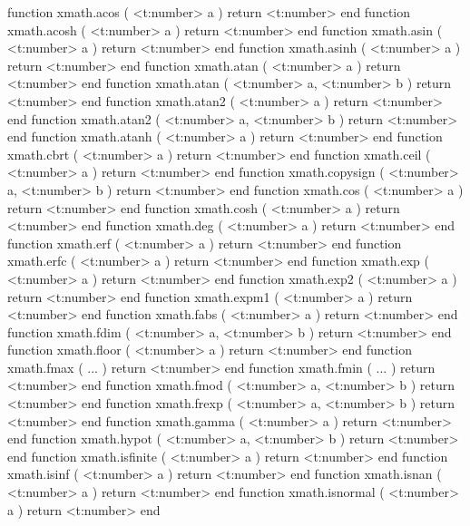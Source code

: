 \starttyping[option=LUA]
function xmath.acos       ( <t:number> a )               return <t:number> end
function xmath.acosh      ( <t:number> a )               return <t:number> end
function xmath.asin       ( <t:number> a )               return <t:number> end
function xmath.asinh      ( <t:number> a )               return <t:number> end
function xmath.atan       ( <t:number> a )               return <t:number> end
function xmath.atan       ( <t:number> a, <t:number> b ) return <t:number> end
function xmath.atan2      ( <t:number> a )               return <t:number> end
function xmath.atan2      ( <t:number> a, <t:number> b ) return <t:number> end
function xmath.atanh      ( <t:number> a )               return <t:number> end
function xmath.cbrt       ( <t:number> a )               return <t:number> end
function xmath.ceil       ( <t:number> a )               return <t:number> end
function xmath.copysign   ( <t:number> a, <t:number> b ) return <t:number> end
function xmath.cos        ( <t:number> a )               return <t:number> end
function xmath.cosh       ( <t:number> a )               return <t:number> end
function xmath.deg        ( <t:number> a )               return <t:number> end
function xmath.erf        ( <t:number> a )               return <t:number> end
function xmath.erfc       ( <t:number> a )               return <t:number> end
function xmath.exp        ( <t:number> a )               return <t:number> end
function xmath.exp2       ( <t:number> a )               return <t:number> end
function xmath.expm1      ( <t:number> a )               return <t:number> end
function xmath.fabs       ( <t:number> a )               return <t:number> end
function xmath.fdim       ( <t:number> a, <t:number> b ) return <t:number> end
function xmath.floor      ( <t:number> a )               return <t:number> end
function xmath.fmax       ( ... )                        return <t:number> end
function xmath.fmin       ( ... )                        return <t:number> end
function xmath.fmod       ( <t:number> a, <t:number> b ) return <t:number> end
function xmath.frexp      ( <t:number> a, <t:number> b ) return <t:number> end
function xmath.gamma      ( <t:number> a )               return <t:number> end
function xmath.hypot      ( <t:number> a, <t:number> b ) return <t:number> end
function xmath.isfinite   ( <t:number> a )               return <t:number> end
function xmath.isinf      ( <t:number> a )               return <t:number> end
function xmath.isnan      ( <t:number> a )               return <t:number> end
function xmath.isnormal   ( <t:number> a )               return <t:number> end
